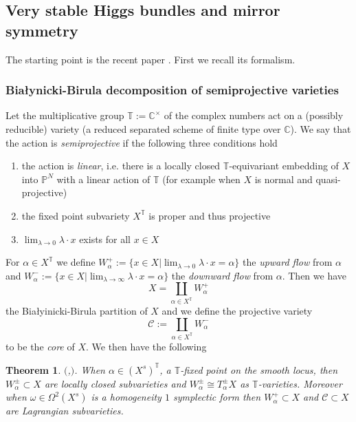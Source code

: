 \documentclass[12pt]{article}
\numberwithin{equation}{section}
\newtheorem{theorem}{Theorem}
\theoremstyle{remark}
\numberwithin{theorem}{section}
\def\C{\mathbb{C}}
\def\P{\mathbb{P}}
\newcommand{\T}{{\mathbb{T}}}
\def\calC{{\mathcal C}}
\numberwithin{equation}{section}
\begin{document}


\subsection{Very stable Higgs bundles and mirror symmetry}

The starting point is the recent paper \cite{hausel-hitchin}. First we recall its formalism. 

\subsubsection{Białynicki-Birula decomposition of semiprojective varieties}

Let the multiplicative group $\T:=\C^\times$ of the complex numbers act on a (possibly reducible) variety (a reduced separated  scheme of finite type over $\C$). We say that the action is {\em semiprojective} \cite[\S 1]{hausel-large} if the following three conditions hold \begin{enumerate} \item the action is {\em linear}, i.e. there is a locally closed $\T$-equivariant embedding of $X$ into $\P^N$ with a linear action of $\T$  (for example when $X$ is normal and quasi-projective)
	\item the fixed point subvariety $X^\T$ is proper and thus projective
	\item $\lim_{\lambda\to 0} \lambda\cdot x $ exists for all $x\in X$
\end{enumerate}
For $\alpha\in X^\T$ we define $W^+_\alpha:=\{x\in X| \lim_{\lambda\to 0} \lambda\cdot x = \alpha\}$ the {\em upward flow} from $\alpha$ and $W^-_\alpha:=\{x\in X| \lim_{\lambda\to \infty} \lambda\cdot x = \alpha\}$ the {\em downward flow} from $\alpha$. Then we have  $$X=\coprod_{\alpha\in X^\T} W_\alpha^+$$ the {Białyinicki-Birula partitio}n of $X$ and we define the projective variety $$\calC:=\coprod_{\alpha\in X^\T} W_\alpha^-$$ to be the {\em core }of $X$. We then have the following

\begin{theorem}$\!\!($\cite{bialynicki-birula},\cite[Proposition 2.1,Proposition 2.10]{hausel-hitchin}$)$. When $\alpha\in (X^s)^\T$, a $\T$-fixed point on the smooth locus, then $W^{\pm}_\alpha\subset X$ are locally closed subvarieties and $W^{\pm}_\alpha\cong T^{\pm}_\alpha X$ as $\T$-varieties. Moreover when $\omega\in \Omega^2(X^s)$ is a homogeneity $1$ symplectic form then $W^+_\alpha\subset X$ and $\calC\subset X$ are Lagrangian subvarieties. 
\end{theorem}
\end{document}

